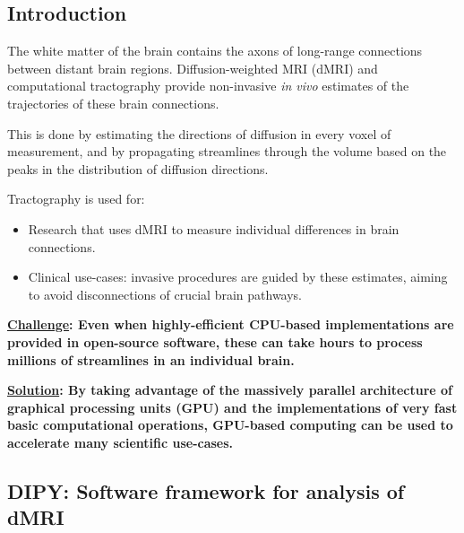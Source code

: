 \documentclass[a0, landscape]{a0poster}
\begin{document}
\begin{multicols}{3} %


\section*{Introduction}

The white matter of the brain contains the axons of long-range connections between distant brain regions. Diffusion-weighted MRI (dMRI) and computational tractography provide non-invasive \emph{in vivo} estimates of the trajectories of these brain connections.

This is done by estimating the directions of diffusion in every voxel of measurement, and by propagating streamlines through the volume based on the peaks in the distribution of diffusion directions.

Tractography is used for:

\begin{itemize}
    \item Research that uses dMRI to measure individual differences in brain connections.
    \item Clinical use-cases: invasive procedures are guided by these estimates, aiming to avoid disconnections of crucial brain pathways.
\end{itemize}

\vspace{0.5em}
\noindent\textbf{\underline{Challenge}: Even when highly-efficient CPU-based implementations are provided in open-source software, these can take hours to process millions of streamlines in an individual brain.}
\vspace{0.5em}

\noindent\textbf{\underline{Solution}: By taking advantage of the massively parallel architecture of graphical processing units (GPU) and the implementations of very fast basic computational operations, GPU-based computing can be used to accelerate many scientific use-cases.}
\vspace{0.5em}

\subsection*{DIPY: Software framework for analysis of dMRI \cite{Garyfallidis2014FrontNeuroinf}}


\end{multicols}
\end{document}
